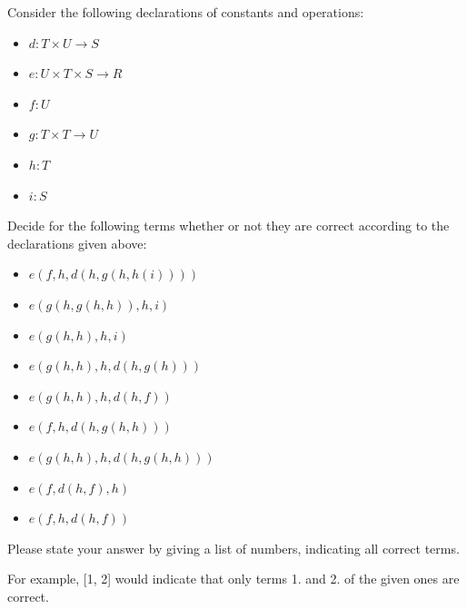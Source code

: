 Consider the following declarations of constants and operations:

\begin{itemize}
\item[] $\mathit{d} : \mathit{T} \times \mathit{U} \to \mathit{S}$
\item[] $\mathit{e} : \mathit{U} \times \mathit{T} \times \mathit{S} \to \mathit{R}$
\item[] $\mathit{f} : \mathit{U}$
\item[] $\mathit{g} : \mathit{T} \times \mathit{T} \to \mathit{U}$
\item[] $\mathit{h} : \mathit{T}$
\item[] $\mathit{i} : \mathit{S}$\end{itemize}Decide for the following terms whether or not they are correct according to the declarations given above:

\begin{itemize}
\item[1.]$\mathit{e(f,h,d(h,g(h,h(i))))}$
\item[2.]$\mathit{e(g(h,g(h,h)),h,i)}$
\item[3.]$\mathit{e(g(h,h),h,i)}$
\item[4.]$\mathit{e(g(h,h),h,d(h,g(h)))}$
\item[5.]$\mathit{e(g(h,h),h,d(h,f))}$
\item[6.]$\mathit{e(f,h,d(h,g(h,h)))}$
\item[7.]$\mathit{e(g(h,h),h,d(h,g(h,h)))}$
\item[8.]$\mathit{e(f,d(h,f),h)}$
\item[9.]$\mathit{e(f,h,d(h,f))}$\end{itemize}Please state your answer by giving a list of numbers, indicating all correct terms.

For example, [1, 2] would indicate that only terms 1. and 2. of the given ones are correct.

